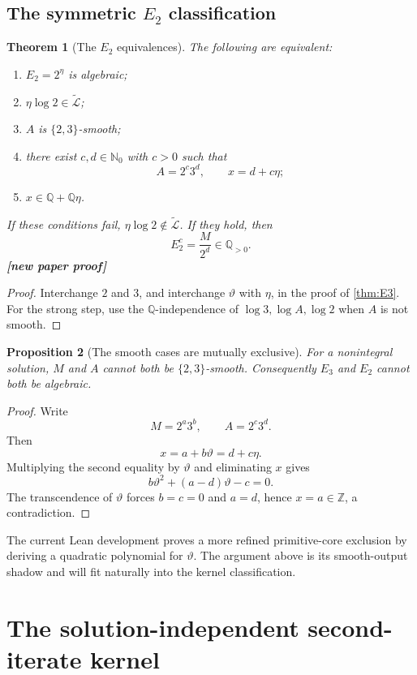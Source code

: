 \documentclass[11pt,oneside]{article}
\newtheorem{theorem}{Theorem}[section]
\newtheorem{proposition}[theorem]{Proposition}
\theoremstyle{definition}
\theoremstyle{remark}
\newcommand{\Nzero}{\mathbb N_0}
\newcommand{\Z}{\mathbb Z}
\newcommand{\Q}{\mathbb Q}
\newcommand{\LL}{\widetilde{\mathcal L}}
\newcommand{\statusnew}{\textcolor{NewViolet}{\textbf{[new paper proof]}}}
\begin{document}
\subsection{The symmetric \texorpdfstring{$E_2$}{E2} classification}

\begin{theorem}[The $E_2$ equivalences]\label{thm:E2}
The following are equivalent:
\begin{enumerate}
\item $E_2=2^{\eta}$ is algebraic;
\item $\eta\log2\in\LL$;
\item $A$ is $\{2,3\}$-smooth;
\item there exist $c,d\in\Nzero$ with $c>0$ such that
      \[
        A=2^c3^d,
        \qquad x=d+c\eta;
      \]
\item $x\in\Q+\Q\eta$.
\end{enumerate}
If these conditions fail, $\eta\log2\notin\LL$.  If they hold, then
\[
  E_2^c=\frac{M}{2^d}\in\Q_{>0}.
\]
\statusnew
\end{theorem}

\begin{proof}
Interchange $2$ and $3$, and interchange $\vartheta$ with $\eta$, in the proof of
\cref{thm:E3}.  For the strong step, use the $\Q$-independence of
$\log3,\log A,\log2$ when $A$ is not smooth.
\end{proof}

\begin{proposition}[The smooth cases are mutually exclusive]\label{prop:not-both-smooth}
For a nonintegral solution, $M$ and $A$ cannot both be $\{2,3\}$-smooth.  Consequently
$E_3$ and $E_2$ cannot both be algebraic.
\end{proposition}

\begin{proof}
Write
\[
  M=2^a3^b,
  \qquad
  A=2^c3^d.
\]
Then
\[
 x=a+b\vartheta=d+c\eta.
\]
Multiplying the second equality by $\vartheta$ and eliminating $x$ gives
\[
 b\vartheta^2+(a-d)\vartheta-c=0.
\]
The transcendence of $\vartheta$ forces $b=c=0$ and $a=d$, hence $x=a\in\Z$, a
contradiction.
\end{proof}

The current Lean development proves a more refined primitive-core exclusion by deriving a
quadratic polynomial for $\vartheta$.  The argument above is its smooth-output shadow and
will fit naturally into the kernel classification.

\section{The solution-independent second-iterate kernel}\label{sec:kernel}
\end{document}
